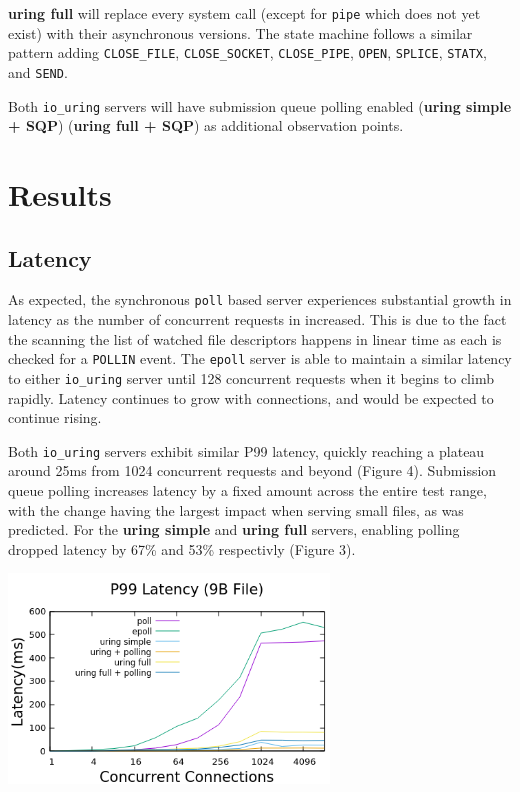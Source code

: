 \documentclass[conference]{IEEEtran}{}
\begin{document}
\textbf{uring full} will replace every system call (except for \texttt{pipe} which does not yet exist) with their asynchronous versions. The state machine follows a similar pattern adding \texttt{CLOSE\_FILE}, \texttt{CLOSE\_SOCKET}, \texttt{CLOSE\_PIPE}, \texttt{OPEN}, \texttt{SPLICE}, \texttt{STATX}, and \texttt{SEND}.

Both \texttt{io\_uring} servers will have submission queue polling enabled (\textbf{uring simple + SQP}) (\textbf{uring full + SQP}) as additional observation points.

\section{Results}
\label{sec:orgfbe6bc5}
\subsection{Latency}
\label{sec:orgc27d179}
As expected, the synchronous \texttt{poll} based server experiences substantial growth in latency as the number of concurrent requests in increased. This is due to the fact the scanning the list of watched file descriptors happens in linear time as each is checked for a \texttt{POLLIN} event. The \texttt{epoll} server is able to maintain a similar latency to either \texttt{io\_uring} server until 128 concurrent requests when it begins to climb rapidly. Latency continues to grow with connections, and would be expected to continue rising.

Both \texttt{io\_uring} servers exhibit similar P99 latency, quickly reaching a plateau around 25ms from 1024 concurrent requests and beyond (Figure 4). Submission queue polling increases latency by a fixed amount across the entire test range, with the change having the largest impact when serving small files, as was predicted. For the \textbf{uring simple} and \textbf{uring full} servers, enabling polling dropped latency by 67\% and 53\% respectivly (Figure 3).

\begin{center}
\includegraphics[width=3.35in]{small_latency.png}
\end{center}
\end{document}
